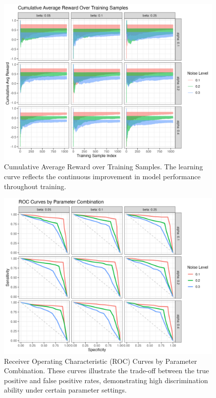 \begin{figure}[h]
    \centering
    \includegraphics[width=0.99\textwidth]{../figures/learning.png}
    \caption{Cumulative Average Reward over Training Samples. The learning curve reflects the continuous improvement in model performance throughout training.}
    \label{fig:learning}
\end{figure}

\begin{figure}[h]
    \centering
    \includegraphics[width=0.99\textwidth]{../figures/roc_curve.png}
    \caption{Receiver Operating Characteristic (ROC) Curves by Parameter Combination. These curves illustrate the trade-off between the true positive and false positive rates, demonstrating high discrimination ability under certain parameter settings.}
    \label{fig:roc_curve}
\end{figure}

